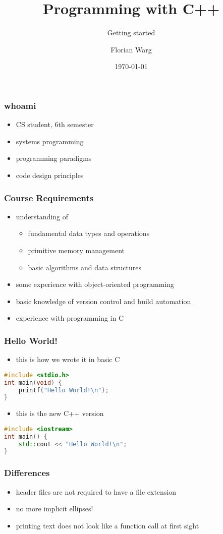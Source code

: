 \documentclass[10pt, compress, usenames, dvipsnames]{beamer}
\title{Programming with C++}
\subtitle{Getting started}
\date{\today}
\author{Florian Warg}
\institute{Institute or miscellaneous information}
\begin{document}
\maketitle

\begin{frame}[fragile]
    \frametitle{whoami}
    \begin{itemize}
    \item CS student, 6th semester
    \item systems programming
    \item programming paradigms
    \item code design principles
    \end{itemize}
\end{frame}

\begin{frame}[fragile]
    \frametitle{Course Requirements}
    \begin{itemize}
    \item understanding of
        \begin{itemize}
            \item fundamental data types and operations
            \item primitive memory management
            \item basic algorithms and data structures
        \end{itemize}    
    \item some experience with object-oriented programming
    \item basic knowledge of version control and build automation
    \item experience with programming in C
    \end{itemize}
\end{frame}

\begin{frame}[fragile]
    \frametitle{Hello World!}
    \begin{itemize}
        \item this is how we wrote it in basic C
    \end{itemize}
    \begin{lstlisting}[language=C++,basicstyle=\ttfamily]
#include <stdio.h>
int main(void) {
    printf("Hello World!\n");
}
    \end{lstlisting}
    \begin{itemize}
        \item this is the new C++ version
    \end{itemize}
    \begin{lstlisting}[language=C++,basicstyle=\ttfamily]
#include <iostream>
int main() {
    std::cout << "Hello World!\n";
}
    \end{lstlisting}
\end{frame}

\begin{frame}[fragile]
    \frametitle{Differences}
    \begin{itemize}
        \item header files are not required to have a file extension
        \item no more implicit ellipses!
        \item printing text does not look like a function call at first sight
    \end{itemize}
\end{frame}
\end{document}
